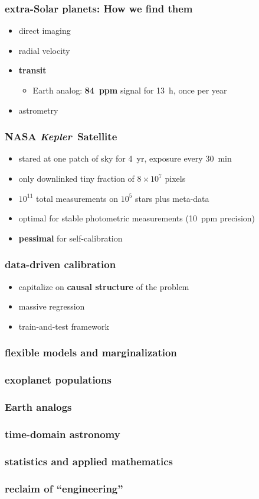 \documentclass{beamer}
\renewcommand{\emph}[1]{\textbf{#1}}
\newcommand{\project}[1]{\textsl{#1}}
\newcommand{\Kepler}{\project{Kepler}}
\begin{document}
\begin{frame}
  \frametitle{extra-Solar planets: How we find them}
  \begin{itemize}
  \item direct imaging
  \item radial velocity
  \item \emph{transit}
    \begin{itemize}
    \item Earth analog: \emph{84~ppm} signal for 13~h, once per year
    \end{itemize}
  \item astrometry
  \end{itemize}
\end{frame}

\begin{frame}
  \frametitle{NASA \Kepler\ Satellite}
  \begin{itemize}
  \item stared at one patch of sky for 4~yr, exposure every 30~min
  \item only downlinked tiny fraction of $8\times 10^7$ pixels
  \item $10^{11}$ total measurements on $10^5$ stars plus meta-data
  \item optimal for stable photometric measurements (10~ppm precision)
  \item \emph{pessimal} for self-calibration
  \end{itemize}
\end{frame}

\begin{frame}
  \frametitle{data-driven calibration}
  \begin{itemize}
  \item capitalize on \emph{causal structure} of the problem
  \item massive regression
  \item train-and-test framework
  \end{itemize}
\end{frame}

\begin{frame}
  \frametitle{flexible models and marginalization}
\end{frame}

\begin{frame}
  \frametitle{exoplanet populations}
\end{frame}

\begin{frame}
  \frametitle{Earth analogs}
\end{frame}

\begin{frame}
  \frametitle{time-domain astronomy}
\end{frame}

\begin{frame}
  \frametitle{statistics and applied mathematics}
\end{frame}

\begin{frame}
  \frametitle{reclaim of ``engineering''}
\end{frame}
\end{document}

